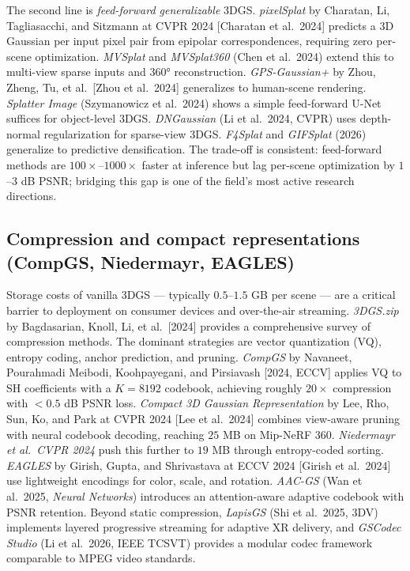 The second line is \emph{feed-forward generalizable} 3DGS. \emph{pixelSplat} by Charatan, Li, Tagliasacchi, and Sitzmann at CVPR 2024 {[}Charatan et al.~2024{]} predicts a 3D Gaussian per input pixel pair from epipolar correspondences, requiring zero per-scene optimization. \emph{MVSplat} and \emph{MVSplat360} (Chen et al.~2024) extend this to multi-view sparse inputs and 360° reconstruction. \emph{GPS-Gaussian+} by Zhou, Zheng, Tu, et al.~{[}Zhou et al.~2024{]} generalizes to human-scene rendering. \emph{Splatter Image} (Szymanowicz et al.~2024) shows a simple feed-forward U-Net suffices for object-level 3DGS. \emph{DNGaussian} (Li et al.~2024, CVPR) uses depth-normal regularization for sparse-view 3DGS. \emph{F4Splat} and \emph{GIFSplat} (2026) generalize to predictive densification. The trade-off is consistent: feed-forward methods are \(100\times\)--\(1000\times\) faster at inference but lag per-scene optimization by \(1\)--\(3\) dB PSNR; bridging this gap is one of the field's most active research directions.

\subsection{Compression and compact representations (CompGS, Niedermayr, EAGLES)}\label{compression-and-compact-representations-compgs-niedermayr-eagles}

Storage costs of vanilla 3DGS --- typically \(0.5\)--\(1.5\) GB per scene --- are a critical barrier to deployment on consumer devices and over-the-air streaming. \emph{3DGS.zip} by Bagdasarian, Knoll, Li, et al.~{[}2024{]} provides a comprehensive survey of compression methods. The dominant strategies are vector quantization (VQ), entropy coding, anchor prediction, and pruning. \emph{CompGS} by Navaneet, Pourahmadi Meibodi, Koohpayegani, and Pirsiavash {[}2024, ECCV{]} applies VQ to SH coefficients with a \(K=8192\) codebook, achieving roughly \(20\times\) compression with \(<0.5\) dB PSNR loss. \emph{Compact 3D Gaussian Representation} by Lee, Rho, Sun, Ko, and Park at CVPR 2024 {[}Lee et al.~2024{]} combines view-aware pruning with neural codebook decoding, reaching \(25\) MB on Mip-NeRF 360. \emph{Niedermayr et al.~CVPR 2024} push this further to \(19\) MB through entropy-coded sorting. \emph{EAGLES} by Girish, Gupta, and Shrivastava at ECCV 2024 {[}Girish et al.~2024{]} use lightweight encodings for color, scale, and rotation. \emph{AAC-GS} (Wan et al.~2025, \emph{Neural Networks}) introduces an attention-aware adaptive codebook with PSNR retention. Beyond static compression, \emph{LapisGS} (Shi et al.~2025, 3DV) implements layered progressive streaming for adaptive XR delivery, and \emph{GSCodec Studio} (Li et al.~2026, IEEE TCSVT) provides a modular codec framework comparable to MPEG video standards.

